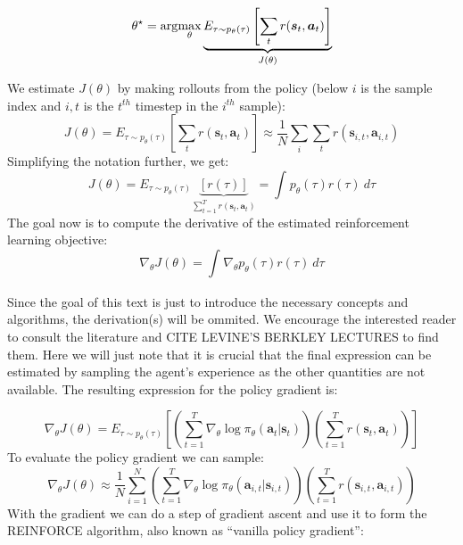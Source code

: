 \begin{equation}
		\theta^\star = \arg\!\max_\theta \underbrace{E_{\tau \sim p_\theta (\tau)} \left [ \sum_t r(\bm{s}_t, \bm{a}_t) \right ]}_{J(\theta)}
\end{equation}

We estimate $J(\theta)$ by making rollouts from the policy (below $i$ is the sample index and $i,t$ is the $t^{th}$ timestep
in the $i^{th}$ sample):
\begin{equation}
		J(\theta) = E_{\tau \sim p_\theta(\tau)} \left [ \sum_t r(\bm{s}_t, \bm{a}_t) \right ] \approx 
		\frac{1}{N} \sum_i \sum_t r(\bm{s}_{i,t}, \bm{a}_{i,t})
\end{equation}
Simplifying the notation further, we get:
\begin{equation}
		J(\theta) = E_{\tau \sim p_\theta(\tau)} \underbrace{[r(\tau)]}_{\sum^{T}_{t=1} r(\bm{s}_t, \bm{a}_t)} = 
		\int_{{}}^{} {p_\theta(\tau)r(\tau)} \: d{\tau} {}
\end{equation}
The goal now is to compute the derivative of the estimated reinforcement learning
objective:
\begin{equation}
		\label{eq:derivative-of-estimated-rl-obj}
		\nabla_\theta J(\theta) = \int_{{}}^{{}} {\nabla_\theta p_\theta (\tau) r(\tau)} \: d{\tau} {}
\end{equation}

Since the goal of this text is just to introduce the necessary concepts
and algorithms, the derivation(s) will be ommited.
We encourage the interested reader to consult the literature \cite{suttonrlbook}
and CITE LEVINE'S BERKLEY LECTURES to find them.
Here we will just note that it is crucial that the final expression
can be estimated by sampling the agent's experience 
as the other quantities are not available.
The resulting expression for the policy gradient \label{eq:derivative-of-estimated-rl-obj} is:

\begin{equation}
		\label{eq:policy-gradient}
		\nabla_\theta J(\theta) = E_{\tau \sim p_\theta(\tau)} 
		\left [ \left ( \sum_{t=1}^{T} \nabla_\theta \log \pi_\theta (\bm{a}_t | \bm{s}_t ) \right )
		\left ( \sum_{t=1}^{T} r(\bm{s}_t, \bm{a}_t) \right ) \right ]
\end{equation}
To evaluate the policy gradient we can sample:
\begin{equation}
		\label{eq:estimated-policy-gradient}
		\nabla_\theta J(\theta) \approx \frac{1}{N}  \sum_{i=1}^{N} 
		\left ( \sum_{t=1}^{T} \nabla_\theta \log \pi_\theta (\bm{a}_{i,t} | \bm{s}_{i,t} ) \right )
		\left ( \sum_{t=1}^{T} r(\bm{s}_{i,t}, \bm{a}_{i,t}) \right )
\end{equation}
With the gradient we can do a step of gradient ascent and use it to form
the REINFORCE algorithm, also known as ``vanilla policy gradient'':

